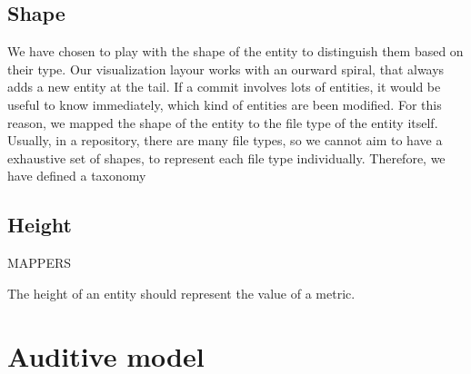 \subsection*{Shape}
We have chosen to play with the shape of the entity to distinguish them based on their type. 
Our visualization layour works with an ourward spiral, that always adds a new entity at the tail. 
If a commit involves lots of entities, it would be useful to know immediately, which kind of entities are been modified. 
For this reason, we mapped the shape of the entity to the file type of the entity itself.
Usually, in a repository, there are many file types, so we cannot aim to have a exhaustive set of shapes, to represent each file type individually. 
Therefore, we have defined a taxonomy

\subsection*{Height}
MAPPERS 


The height of an entity should represent the value of a metric.


\section{Auditive model}
